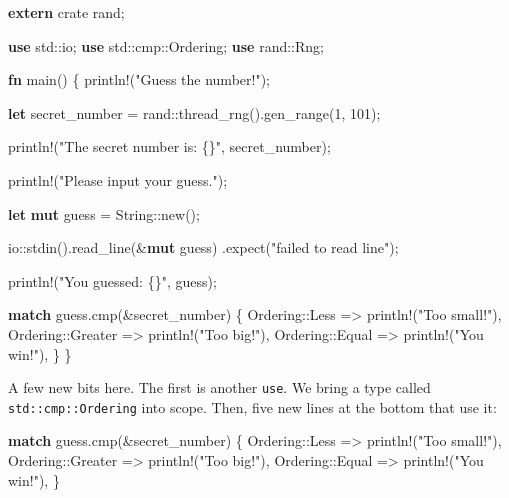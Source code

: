 \documentclass[a4paper,]{book}
\newenvironment{Shaded}{\begin{snugshade}}{\end{snugshade}}
\newcommand{\KeywordTok}[1]{\textcolor[rgb]{0.13,0.29,0.53}{\textbf{{#1}}}}
\newcommand{\DecValTok}[1]{\textcolor[rgb]{0.00,0.00,0.81}{{#1}}}
\newcommand{\StringTok}[1]{\textcolor[rgb]{0.31,0.60,0.02}{{#1}}}
\newcommand{\OtherTok}[1]{\textcolor[rgb]{0.56,0.35,0.01}{{#1}}}
\newcommand{\NormalTok}[1]{{#1}}
\begin{document}
\begin{Shaded}
\begin{Highlighting}[]
\KeywordTok{extern} \NormalTok{crate rand;}

\KeywordTok{use} \NormalTok{std::io;}
\KeywordTok{use} \NormalTok{std::cmp::Ordering;}
\KeywordTok{use} \NormalTok{rand::Rng;}

\KeywordTok{fn} \NormalTok{main() \{}
    \OtherTok{println!}\NormalTok{(}\StringTok{"Guess the number!"}\NormalTok{);}

    \KeywordTok{let} \NormalTok{secret_number = rand::thread_rng().gen_range(}\DecValTok{1}\NormalTok{, }\DecValTok{101}\NormalTok{);}

    \OtherTok{println!}\NormalTok{(}\StringTok{"The secret number is: \{\}"}\NormalTok{, secret_number);}

    \OtherTok{println!}\NormalTok{(}\StringTok{"Please input your guess."}\NormalTok{);}

    \KeywordTok{let} \KeywordTok{mut} \NormalTok{guess = String::new();}

    \NormalTok{io::stdin().read_line(&}\KeywordTok{mut} \NormalTok{guess)}
        \NormalTok{.expect(}\StringTok{"failed to read line"}\NormalTok{);}

    \OtherTok{println!}\NormalTok{(}\StringTok{"You guessed: \{\}"}\NormalTok{, guess);}

    \KeywordTok{match} \NormalTok{guess.cmp(&secret_number) \{}
        \NormalTok{Ordering::Less    => }\OtherTok{println!}\NormalTok{(}\StringTok{"Too small!"}\NormalTok{),}
        \NormalTok{Ordering::Greater => }\OtherTok{println!}\NormalTok{(}\StringTok{"Too big!"}\NormalTok{),}
        \NormalTok{Ordering::Equal   => }\OtherTok{println!}\NormalTok{(}\StringTok{"You win!"}\NormalTok{),}
    \NormalTok{\}}
\NormalTok{\}}
\end{Highlighting}
\end{Shaded}

A few new bits here. The first is another \texttt{use}. We bring a type
called \texttt{std::cmp::Ordering} into scope. Then, five new lines at
the bottom that use it:

\begin{Shaded}
\begin{Highlighting}[]
\KeywordTok{match} \NormalTok{guess.cmp(&secret_number) \{}
    \NormalTok{Ordering::Less    => }\OtherTok{println!}\NormalTok{(}\StringTok{"Too small!"}\NormalTok{),}
    \NormalTok{Ordering::Greater => }\OtherTok{println!}\NormalTok{(}\StringTok{"Too big!"}\NormalTok{),}
    \NormalTok{Ordering::Equal   => }\OtherTok{println!}\NormalTok{(}\StringTok{"You win!"}\NormalTok{),}
\NormalTok{\}}
\end{Highlighting}
\end{Shaded}
\end{document}
